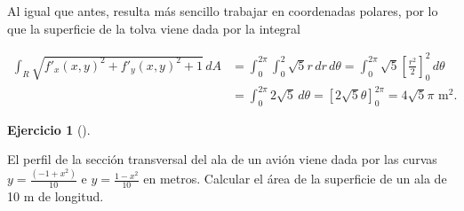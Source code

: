 \documentclass[
  spanish,
  a4paper,
]{scrreport}
\theoremstyle{definition}
\newtheorem{exercise}{Ejercicio}[chapter]
\theoremstyle{remark}
\begin{document}
\begin{tcolorbox}
Al igual que antes, resulta más sencillo trabajar en coordenadas
polares, por lo que la superficie de la tolva viene dada por la integral

\begin{align*}
\int_R \sqrt{f'_x(x,y)^2+f'_y(x,y)^2+1}\,dA
&= \int_{0}^{2\pi} \int_0^2 \sqrt{5}r \,dr\,d\theta 
= \int_{0}^{2\pi} \sqrt{5}\left[\frac{r^2}{2}\right]_0^2\,d\theta \\
&= \int_{0}^{2\pi} 2\sqrt{5}\,d\theta 
= [2\sqrt{5}\theta]_0^{2\pi}
= 4\sqrt{5}\pi \mbox{ m}^2. 
\end{align*}

\end{tcolorbox}

\begin{exercise}[]\protect\hypertarget{exr-area-ala-avión}{}\label{exr-area-ala-avión}

El perfil de la sección transversal del ala de un avión viene dada por
las curvas \(y=\frac{(-1+x^2)}{10}\) e \(y=\frac{1-x^2}{10}\) en metros.
Calcular el área de la superficie de un ala de 10 m de longitud.

\end{exercise}
\end{document}
